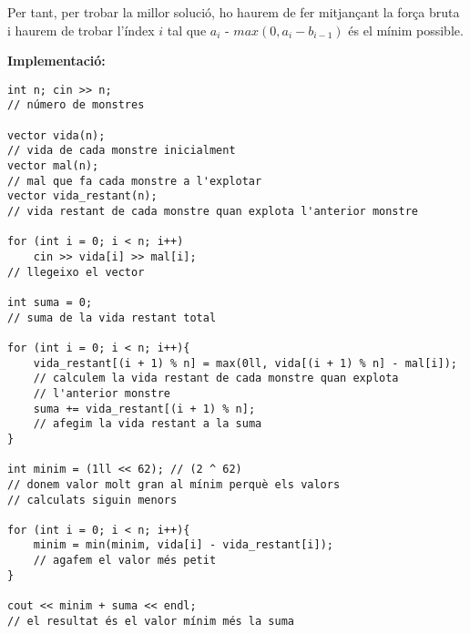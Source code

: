 Per tant, per trobar la millor solució, ho haurem de fer mitjançant la força bruta i haurem de trobar l'índex $i$ tal que $a_{i}$ - $max(0, a_{i} - b_{i - 1})$ és el mínim possible.

\textbf{Implementació:}

\begin{lstlisting}
int n; cin >> n;
// número de monstres

vector vida(n);
// vida de cada monstre inicialment
vector mal(n);
// mal que fa cada monstre a l'explotar
vector vida_restant(n);
// vida restant de cada monstre quan explota l'anterior monstre

for (int i = 0; i < n; i++)
    cin >> vida[i] >> mal[i];
// llegeixo el vector

int suma = 0;
// suma de la vida restant total

for (int i = 0; i < n; i++){
    vida_restant[(i + 1) % n] = max(0ll, vida[(i + 1) % n] - mal[i]);
    // calculem la vida restant de cada monstre quan explota
    // l'anterior monstre
    suma += vida_restant[(i + 1) % n];
    // afegim la vida restant a la suma
}

int minim = (1ll << 62); // (2 ^ 62)
// donem valor molt gran al mínim perquè els valors
// calculats siguin menors

for (int i = 0; i < n; i++){
    minim = min(minim, vida[i] - vida_restant[i]);
    // agafem el valor més petit
}

cout << minim + suma << endl;
// el resultat és el valor mínim més la suma
\end{lstlisting}

